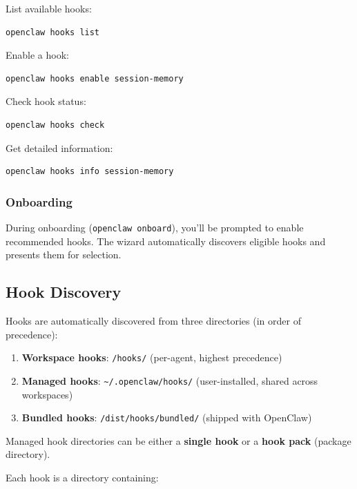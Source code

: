 List available hooks:

\begin{lstlisting}[language=bash]
openclaw hooks list
\end{lstlisting}


Enable a hook:

\begin{lstlisting}[language=bash]
openclaw hooks enable session-memory
\end{lstlisting}


Check hook status:

\begin{lstlisting}[language=bash]
openclaw hooks check
\end{lstlisting}


Get detailed information:

\begin{lstlisting}[language=bash]
openclaw hooks info session-memory
\end{lstlisting}


\subsubsection{Onboarding}


During onboarding (\texttt{openclaw onboard}), you'll be prompted to enable recommended hooks. The wizard automatically discovers eligible hooks and presents them for selection.

\subsection{Hook Discovery}


Hooks are automatically discovered from three directories (in order of precedence):

\begin{enumerate}
  \item \textbf{Workspace hooks}: \texttt{/hooks/} (per-agent, highest precedence)
  \item \textbf{Managed hooks}: \texttt{\textasciitilde{}/.openclaw/hooks/} (user-installed, shared across workspaces)
  \item \textbf{Bundled hooks}: \texttt{/dist/hooks/bundled/} (shipped with OpenClaw)
\end{enumerate}


Managed hook directories can be either a \textbf{single hook} or a \textbf{hook pack} (package directory).

Each hook is a directory containing:

